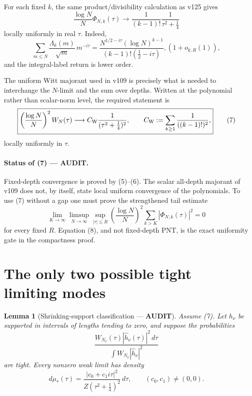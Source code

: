 \documentclass[11pt]{article}
\newcommand{\AUDIT}{\textcolor{orange!70!black}{\textbf{AUDIT}}}
\newtheorem{lemma}{Lemma}
\begin{document}
For each fixed $k$, the same product/divisibility calculation as v125
gives
\begin{equation}
 \frac{\log N}{N}\Phi_{N,k}(\tau)
 \longrightarrow
 \frac1{(k-1)!}\frac1{\tau^2+\frac14}                     \tag{5}
\end{equation}
locally uniformly in real $\tau$.  Indeed,
\begin{equation}
 \sum_{m\le N}\frac{\Lambda_k(m)}{\sqrt m}\,m^{-i\tau}
 =\frac{N^{1/2-i\tau}(\log N)^{k-1}}
       {(k-1)!(\frac12-i\tau)},(1+o_{k,R}(1)),            \tag{6}
\end{equation}
and the integral-label return is lower order.

The uniform Witt majorant used in v109 is precisely what is needed to
interchange the $N$-limit and the sum over depths.  Written at the
polynomial rather than scalar-norm level, the required statement is
\begin{equation}
 \boxed{
 \left(\frac{\log N}{N}\right)^2W_N(\tau)
 \longrightarrow
 C_{\rm W}\frac1{(\tau^2+\frac14)^2},
 \qquad
 C_{\rm W}:=\sum_{k\ge1}\frac1{((k-1)!)^2},}              \tag{7}
\end{equation}
locally uniformly in $\tau$.

\paragraph{Status of (7) --- \AUDIT.}
Fixed-depth convergence is proved by (5)--(6).  The scalar all-depth
majorant of v109 does not, by itself, state local uniform convergence of
the polynomials.  To use (7) without a gap one must prove the strengthened
tail estimate
\begin{equation}
 \lim_{K\to\infty}\limsup_{N\to\infty}
 \sup_{|\tau|\le R}
 \left(\frac{\log N}{N}\right)^2
 \sum_{k>K}|\Phi_{N,k}(\tau)|^2=0                         \tag{8}
\end{equation}
for every fixed $R$.  Equation (8), and not fixed-depth PNT, is the exact
uniformity gate in the compactness proof.

\section{The only two possible tight limiting modes}

\begin{lemma}[Shrinking-support classification --- \AUDIT]
Assume (7).  Let $h_\nu$ be supported in intervals of lengths tending to
zero, and suppose the probabilities
\[
 \frac{W_{N_\nu}(\tau)|\widehat h_\nu(\tau)|^2\,d\tau}
      {\int W_{N_\nu}|\widehat h_\nu|^2}
\]
are tight.  Every nonzero weak limit has density
\begin{equation}
 d\mu_*(\tau)=
 \frac{|c_0+c_1i\tau|^2}{Z(\tau^2+\frac14)^2}\,d\tau,
 \qquad (c_0,c_1)\ne(0,0).                                \tag{9}
\end{equation}
\end{lemma}
\end{document}
